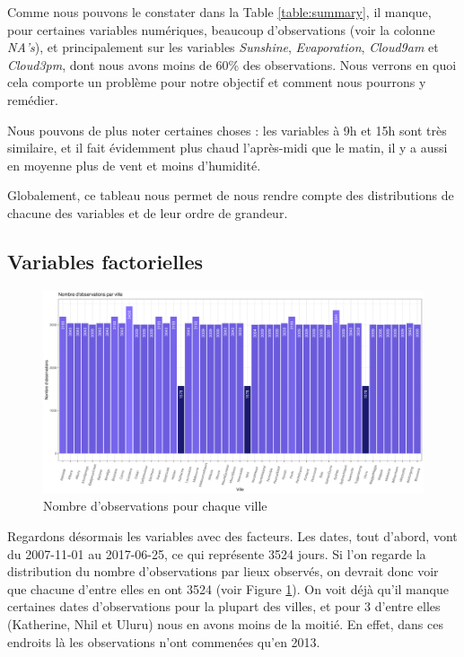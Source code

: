 \documentclass{article}
\begin{document}
Comme nous pouvons le constater dans la Table \ref{table:summary}, il manque, pour certaines variables numériques, beaucoup d'observations (voir la colonne \emph{NA's}), et principalement sur les variables \emph{Sunshine}, \emph{Evaporation}, \emph{Cloud9am} et \emph{Cloud3pm}, dont nous avons moins de 60\% des observations. Nous verrons en quoi cela comporte un problème pour notre objectif et comment nous pourrons y remédier.

Nous pouvons de plus noter certaines choses : les variables à 9h et 15h sont très similaire, et il fait évidemment plus chaud l'après-midi que le matin, il y a aussi en moyenne plus de vent et moins d'humidité. 

Globalement, ce tableau nous permet de nous rendre compte des distributions de chacune des variables et de leur ordre de grandeur. 

\subsection{Variables factorielles}

\begin{figure}[htp]
    \centering
    \includegraphics[width=\textwidth]{Images/hist_observations_cities.pdf}
    \caption{Nombre d'observations pour chaque ville}
    \label{fig:obs_per_cities}
\end{figure}

Regardons désormais les variables avec des facteurs. Les dates, tout d'abord, vont du 2007-11-01 au 2017-06-25, ce qui représente 3524 jours. Si l'on regarde la distribution du nombre d'observations par lieux observés, on devrait donc voir que chacune d'entre elles en ont 3524 (voir Figure \ref{fig:obs_per_cities}). On voit déjà qu'il manque certaines dates d'observations pour la plupart des villes, et pour 3 d'entre elles (Katherine, Nhil et Uluru) nous en avons moins de la moitié. En effet, dans ces endroits là les observations n'ont commenées qu'en 2013.
\end{document}
